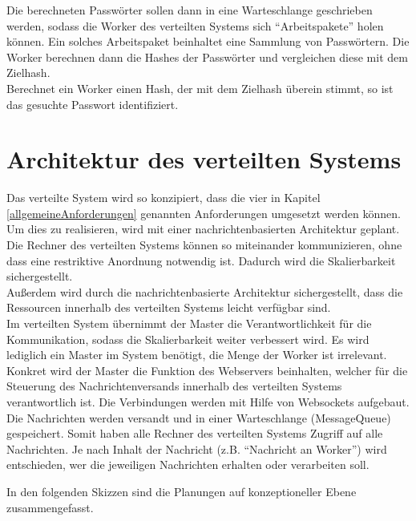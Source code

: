Die berechneten Passwörter sollen dann in eine Warteschlange geschrieben werden, sodass die Worker des verteilten Systems sich \enquote{Arbeitspakete} holen können. Ein solches Arbeitspaket beinhaltet eine Sammlung von Passwörtern. Die Worker berechnen dann die Hashes der Passwörter und vergleichen diese mit dem Zielhash.\\
 Berechnet ein Worker einen Hash, der mit dem Zielhash überein stimmt, so ist das gesuchte Passwort identifiziert.  

\newpage

\section{Architektur des verteilten Systems}
Das verteilte System wird so konzipiert, dass die vier in Kapitel \ref{allgemeineAnforderungen} genannten Anforderungen umgesetzt werden können. Um dies zu realisieren, wird mit einer nachrichtenbasierten Architektur geplant. Die Rechner des verteilten Systems können so miteinander kommunizieren, ohne dass eine restriktive Anordnung notwendig ist. Dadurch wird die Skalierbarkeit sichergestellt. \\
Außerdem wird durch die nachrichtenbasierte Architektur sichergestellt, dass die Ressourcen innerhalb des verteilten Systems leicht verfügbar sind. \\
Im verteilten System übernimmt der Master die Verantwortlichkeit für die Kommunikation, sodass die Skalierbarkeit weiter verbessert wird. Es wird lediglich ein Master im System benötigt, die Menge der Worker ist irrelevant. Konkret wird der Master die Funktion des Webservers beinhalten, welcher für die Steuerung des Nachrichtenversands innerhalb des verteilten Systems verantwortlich ist. Die Verbindungen werden mit Hilfe von Websockets aufgebaut.\\
Die Nachrichten werden versandt und in einer Warteschlange (MessageQueue) gespeichert. Somit haben alle Rechner des verteilten Systems Zugriff auf alle Nachrichten. Je nach Inhalt der Nachricht (z.B. \enquote{Nachricht an Worker}) wird entschieden, wer die jeweiligen Nachrichten erhalten oder verarbeiten soll. 

In den folgenden Skizzen sind die Planungen auf konzeptioneller Ebene zusammengefasst.





